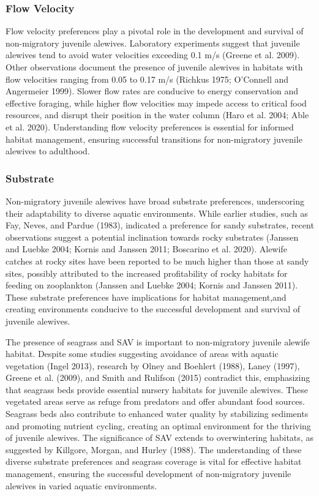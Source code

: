 \documentclass[
]{book}
\begin{document}
\hypertarget{flow-velocity-1}{%
\subsubsection{Flow Velocity}\label{flow-velocity-1}}

Flow velocity preferences play a pivotal role in the development and survival of non-migratory juvenile alewives. Laboratory experiments suggest that juvenile alewives tend to avoid water velocities exceeding 0.1 m/s (Greene et al. 2009). Other observations document the presence of juvenile alewives in habitats with flow velocities ranging from 0.05 to 0.17 m/s (Richkus 1975; O'Connell and Angermeier 1999). Slower flow rates are conducive to energy conservation and effective foraging, while higher flow velocities may impede access to critical food resources, and disrupt their position in the water column (Haro et al. 2004; Able et al. 2020). Understanding flow velocity preferences is essential for informed habitat management, ensuring successful transitions for non-migratory juvenile alewives to adulthood.

\hypertarget{substrate-1}{%
\subsubsection{Substrate}\label{substrate-1}}

Non-migratory juvenile alewives have broad substrate preferences, underscoring their adaptability to diverse aquatic environments. While earlier studies, such as Fay, Neves, and Pardue (1983), indicated a preference for sandy substrates, recent observations suggest a potential inclination towards rocky substrates (Janssen and Luebke 2004; Kornis and Janssen 2011; Boscarino et al. 2020). Alewife catches at rocky sites have been reported to be much higher than those at sandy sites, possibly attributed to the increased profitability of rocky habitats for feeding on zooplankton (Janssen and Luebke 2004; Kornis and Janssen 2011). These substrate preferences have implications for habitat management,and creating environments conducive to the successful development and survival of juvenile alewives.

The presence of seagrass and SAV is important to non-migratory juvenile alewife habitat. Despite some studies suggesting avoidance of areas with aquatic vegetation (Ingel 2013), research by Olney and Boehlert (1988), Laney (1997), Greene et al. (2009), and Smith and Rulifson (2015) contradict this, emphasizing that seagrass beds provide essential nursery habitats for juvenile alewives. These vegetated areas serve as refuge from predators and offer abundant food sources. Seagrass beds also contribute to enhanced water quality by stabilizing sediments and promoting nutrient cycling, creating an optimal environment for the thriving of juvenile alewives. The significance of SAV extends to overwintering habitats, as suggested by Killgore, Morgan, and Hurley (1988). The understanding of these diverse substrate preferences and seagrass coverage is vital for effective habitat management, ensuring the successful development of non-migratory juvenile alewives in varied aquatic environments.
\end{document}
